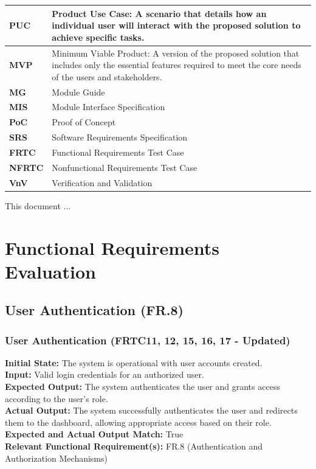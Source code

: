 \documentclass[12pt, titlepage]{article}
\begin{document}
\begin{longtable}[c]{|p{}|p{}|}
  \textbf{PUC} & Product Use Case: A scenario that details how an individual user will interact with the proposed solution to achieve specific tasks. \\ \hline
  \textbf{MVP} & Minimum Viable Product: A version of the proposed solution that includes only the essential features required to meet the core needs of the users and stakeholders. \\ \hline
  \textbf{MG} & Module Guide \\ \hline
  \textbf{MIS} & Module Interface Specification \\ \hline
  \textbf{PoC} & Proof of Concept \\ \hline
  \textbf{SRS} & Software Requirements Specification \\ \hline
  \textbf{FRTC} & Functional Requirements Test Case \\ \hline
  \textbf{NFRTC} & Nonfunctional Requirements Test Case \\ \hline
  \textbf{VnV} & Verification and Validation \\ \hline
\end{longtable}

\newpage

\tableofcontents

\listoftables %

\listoffigures %

\newpage


This document ...

\section{Functional Requirements Evaluation}

\subsection{User Authentication (FR.8)}
\subsubsection{User Authentication (FRTC11, 12, 15, 16, 17 - Updated)}
\textbf{Initial State:} The system is operational with user accounts created.\\
\textbf{Input:} Valid login credentials for an authorized user.\\
\textbf{Expected Output:} The system authenticates the user and grants access according to the user's role.\\
\textbf{Actual Output:} The system successfully authenticates the user and redirects them to the dashboard, allowing appropriate access based on their role.\\
\textbf{Expected and Actual Output Match:} True\\
\textbf{Relevant Functional Requirement(s):} FR.8 (Authentication and Authorization Mechanisms)\\
\end{document}

